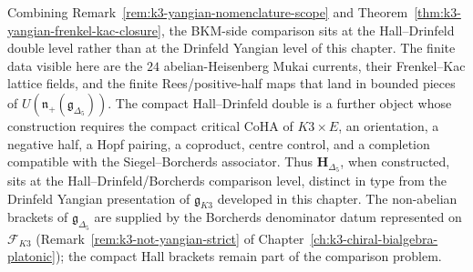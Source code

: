 \begin{remark}
\label{rem:k3-yangian-hall-drinfeld-scope}
Combining Remark~\ref{rem:k3-yangian-nomenclature-scope} and
Theorem~\ref{thm:k3-yangian-frenkel-kac-closure}, the BKM-side
comparison sits at the Hall--Drinfeld double level rather than at the
Drinfeld Yangian level of this chapter. The finite data visible here
are the $24$ abelian-Heisenberg Mukai currents, their
Frenkel--Kac lattice fields, and the finite Rees/positive-half maps that
land in bounded pieces of
$U(\mathfrak n_+(\mathfrak g_{\Delta_5}))$. The compact
Hall--Drinfeld double is a further object whose construction requires
the compact critical CoHA of $K3\times E$, an orientation, a negative
half, a Hopf pairing, a coproduct, centre control, and a completion
compatible with the Siegel--Borcherds associator. Thus
$\mathbf{H}_{\Delta_5}$, when constructed, sits at the
Hall--Drinfeld/Borcherds comparison level, distinct in type from the
Drinfeld Yangian presentation of $\mathfrak{g}_{K3}$ developed in this
chapter. The
non-abelian brackets of $\mathfrak g_{\Delta_5}$ are supplied by the
Borcherds denominator datum represented on $\mathcal{F}_{K3}$
(Remark~\ref{rem:k3-not-yangian-strict} of
Chapter~\ref{ch:k3-chiral-bialgebra-platonic}); the compact Hall
brackets remain part of the comparison problem.
\end{remark}

